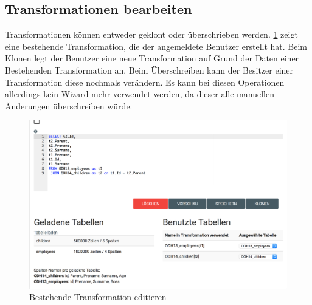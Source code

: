 \subsection{Transformationen bearbeiten}
Transformationen können entweder geklont oder überschrieben werden. \cref{fig:pd:transformation-edit} zeigt eine bestehende Transformation, die der angemeldete Benutzer erstellt hat. Beim Klonen legt der Benutzer eine neue Transformation auf Grund der Daten einer Bestehenden Transformation an. Beim Überschreiben kann der Besitzer einer Transformation diese nochmals verändern. Es kann bei diesen Operationen allerdings kein Wizard mehr verwendet werden, da dieser alle manuellen Änderungen überschreiben würde.
\begin{figure}[H]
\centering
\includegraphics[width=\linewidth]{fig/transformation-edit.png}
\caption{Bestehende Transformation editieren}
\label{fig:pd:transformation-edit}
\end{figure}